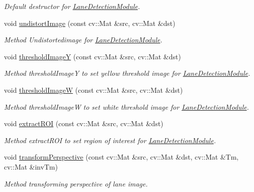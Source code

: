 \begin{DoxyCompactItemize}
\begin{DoxyCompactList}\small\item\em Default destructor for \hyperlink{classLaneDetectionModule}{Lane\+Detection\+Module}. \end{DoxyCompactList}\item 
void \hyperlink{classLaneDetectionModule_aff46b8eb6123f639c84eabb574f03241}{undistort\+Image} (const cv\+::\+Mat \&src, cv\+::\+Mat \&dst)
\begin{DoxyCompactList}\small\item\em Method Undistortedimage for \hyperlink{classLaneDetectionModule}{Lane\+Detection\+Module}. \end{DoxyCompactList}\item 
void \hyperlink{classLaneDetectionModule_aca6f7ab235dcfd5f162ee3fd876a3f8a}{threshold\+ImageY} (const cv\+::\+Mat \&src, cv\+::\+Mat \&dst)
\begin{DoxyCompactList}\small\item\em Method threshold\+ImageY to set yellow threshold image for \hyperlink{classLaneDetectionModule}{Lane\+Detection\+Module}. \end{DoxyCompactList}\item 
void \hyperlink{classLaneDetectionModule_ae3478b6b12b994fdda59573ce1b9f57f}{threshold\+ImageW} (const cv\+::\+Mat \&src, cv\+::\+Mat \&dst)
\begin{DoxyCompactList}\small\item\em Method threshold\+ImageW to set white threshold image for \hyperlink{classLaneDetectionModule}{Lane\+Detection\+Module}. \end{DoxyCompactList}\item 
void \hyperlink{classLaneDetectionModule_ad05cacb2cac52d64ee0ab295dcbcd7af}{extract\+R\+OI} (const cv\+::\+Mat \&src, cv\+::\+Mat \&dst)
\begin{DoxyCompactList}\small\item\em Method extract\+R\+OI to set region of interest for \hyperlink{classLaneDetectionModule}{Lane\+Detection\+Module}. \end{DoxyCompactList}\item 
void \hyperlink{classLaneDetectionModule_a3b8c0ca214fbf200c25bd24194140afc}{transform\+Perspective} (const cv\+::\+Mat \&src, cv\+::\+Mat \&dst, cv\+::\+Mat \&Tm, cv\+::\+Mat \&inv\+Tm)
\begin{DoxyCompactList}\small\item\em Method transforming perspective of lane image. \end{DoxyCompactList}\item 

\end{DoxyCompactItemize}
